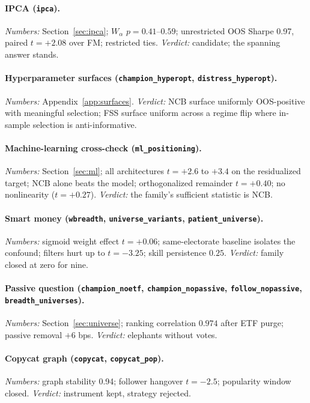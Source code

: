 \paragraph{IPCA (\texttt{ipca}).}
\emph{Numbers:} Section~\ref{sec:ipca}; $W_\alpha$ $p=0.41$--$0.59$;
unrestricted OOS Sharpe 0.97, paired $t=+2.08$ over FM; restricted
ties. \emph{Verdict:} candidate; the spanning answer stands.

\paragraph{Hyperparameter surfaces (\texttt{champion\_hyperopt},
\texttt{distress\_hyperopt}).}
\emph{Numbers:} Appendix~\ref{app:surfaces}. \emph{Verdict:} NCB
surface uniformly OOS-positive with meaningful selection; FSS
surface uniform across a regime flip where in-sample selection is
anti-informative.

\paragraph{Machine-learning cross-check (\texttt{ml\_positioning}).}
\emph{Numbers:} Section~\ref{sec:ml}; all architectures $t=+2.6$ to
$+3.4$ on the residualized target; NCB alone beats the model;
orthogonalized remainder $t=+0.40$; no nonlinearity ($t=+0.27$).
\emph{Verdict:} the family's sufficient statistic is NCB.

\paragraph{Smart money (\texttt{wbreadth},
\texttt{universe\_variants}, \texttt{patient\_universe}).}
\emph{Numbers:} sigmoid weight effect $t=+0.06$; same-electorate
baseline isolates the confound; filters hurt up to $t=-3.25$; skill
persistence $0.25$. \emph{Verdict:} family closed at zero for nine.

\paragraph{Passive question (\texttt{champion\_noetf},
\texttt{champion\_nopassive}, \texttt{follow\_nopassive},
\texttt{breadth\_universes}).}
\emph{Numbers:} Section~\ref{sec:universe}; ranking correlation
$0.974$ after ETF purge; passive removal $+6$ bps. \emph{Verdict:}
elephants without votes.

\paragraph{Copycat graph (\texttt{copycat}, \texttt{copycat\_pop}).}
\emph{Numbers:} graph stability 0.94; follower hangover $t=-2.5$;
popularity window closed. \emph{Verdict:} instrument kept, strategy
rejected.

